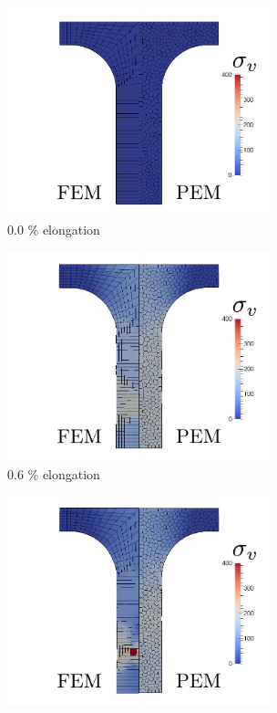 \begin{figure}[!h]
    \centering
    \begin{subfigure}[b]{0.49\linewidth}
            \centering
            \includegraphics[width=3.0in]{figures/necking_t0.pdf}
    			\caption{0.0 \% elongation \label{fig:necking_t0}}
    \end{subfigure}
	\begin{subfigure}[b]{0.49\linewidth}
            \centering
            \includegraphics[width=3.0in]{figures/necking_t1.pdf}
    			\caption{0.6 \% elongation \label{fig:necking_t1}}
    \end{subfigure}
    \begin{subfigure}[b]{0.49\linewidth}
            \centering
            \includegraphics[width=3.0in]{figures/necking_t2.pdf}

\end{subfigure}
\end{figure}
